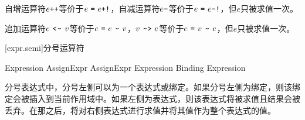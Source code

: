 \pnum
自增运算符$e\texttt{++}$等价于$e\ \texttt{=}\ e\texttt{+!}$，自减运算符$e\texttt{--}$等价于$e\ \tcode{=}\ e\tcode{-!}$，但$e$只被求值一次。

\pnum
追加运算符$e\ \tcode{<\~}\ v$等价于$e\ \tcode{=}\ e\ \tcode{\~}\ v$，$v\ \tcode{\~>}\ e$等价于$e\ \tcode{=}\ v\ \tcode{\~}\ e$，但$e$只被求值一次。

[expr.semi]{分号运算符}

\begin{bnf}{Expression}
    AssignExpr \br
    AssignExpr \terminal{;} Expression\br
    Binding \terminal{;} Expression
\end{bnf}

\pnum
分号表达式中，分号左侧可以为一个表达式或绑定。如果分号左侧为绑定，则该绑定会被插入到当前作用域中。如果左侧为表达式，则该表达式将被求值且结果会被丢弃。在那之后，将对右侧表达式进行求值并将其值作为整个表达式的值。